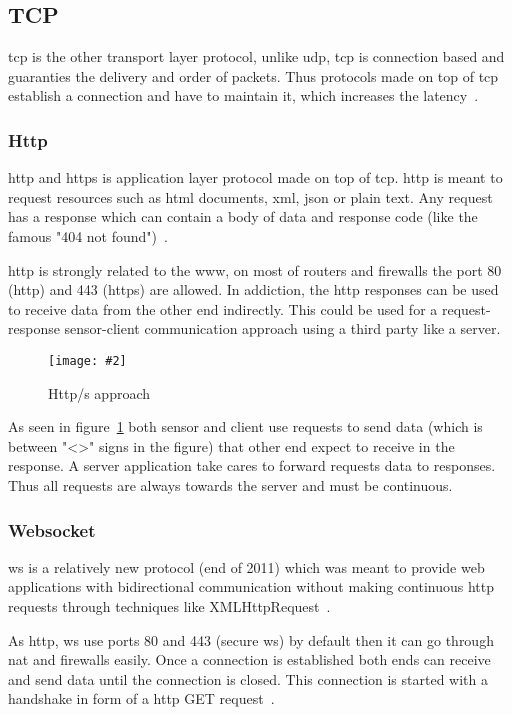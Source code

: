 \documentclass[hidelinks,11pt,a4paper,oneside,article]{memoir}
\newcommand{\putimage}[3][10] %
{
\begin{figure}[h]
	\centering
	\captionsetup{justification=centering}
	\texttt{[image: \#2]}
	\caption{#3}
	\label{fig:#2}
\end{figure}
}
\begin{document}
\subsection{TCP}
\gls{tcp} is the other transport layer protocol, unlike \gls{udp}, \gls{tcp} is connection based and guaranties the delivery and order of packets. Thus protocols made on top of \gls{tcp} establish a connection and have to maintain it, which increases the latency~\cite[19]{tcpip}.

\subsubsection{Http}\label{sec:http}
\gls{http} and \gls{https} is application layer protocol made on top of \gls{tcp}. \gls{http} is meant to request resources such as \gls{html} documents, \gls{xml}, \gls{json} or plain text. Any request has a response which can contain a body of data and response code (like the famous "404 not found")~\cite{http-rfc}.

\gls{http} is strongly related to the www, on most of routers and firewalls the port 80 (\gls{http}) and 443 (\gls{https}) are allowed. In addiction, the \gls{http} responses can be used to receive data from the other end indirectly. This could be used for a request-response sensor-client communication approach using a third party like a server.

\putimage[14]{http-approach}{Http/s approach}

As seen in figure~\ref{fig:http-approach} both sensor and client use requests to send data (which is between "<>" signs in the figure) that other end expect to receive in the response. A server application take cares to forward requests data to responses. Thus all requests are always towards the server and must be continuous.

\subsubsection{Websocket}
\gls{ws} is a relatively new protocol (end of 2011) which was meant to provide web applications with bidirectional communication without making continuous \gls{http} requests through techniques like XMLHttpRequest~\cite[4]{rfc6455}.

As \gls{http}, \gls{ws} use ports 80 and 443 (secure \gls{ws}) by default then it can go through \gls{nat} and firewalls easily. Once a connection is established both ends can receive and send data until the connection is closed. This connection is started with a handshake in form of a \gls{http} GET request~\cite[6]{rfc6455}. 
\end{document}
